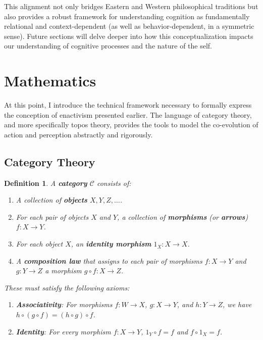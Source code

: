 \documentclass{article}
\newtheorem{definition}{Definition}[section]
\begin{document}
This alignment not only bridges Eastern and Western philosophical traditions but also provides a robust framework for understanding cognition as fundamentally relational and context-dependent (as well as behavior-dependent, in a symmetric sense). Future sections will delve deeper into how this conceptualization impacts our understanding of cognitive processes and the nature of the self.

\section{Mathematics}

At this point, I introduce the technical framework necessary to formally express the conception of enactivism presented earlier. The language of category theory, and more specifically topos theory, provides the tools to model the co-evolution of action and perception abstractly and rigorously.

\subsection{Category Theory}

\begin{definition}
A \textbf{category} $\mathcal{C}$ consists of:
\begin{enumerate}[label=(\alph*)]
    \item A collection of \textbf{objects} $X, Y, Z, \dots$.
    \item For each pair of objects $X$ and $Y$, a collection of \textbf{morphisms} (or \textbf{arrows}) $f \colon X \to Y$.
    \item For each object $X$, an \textbf{identity morphism} $1_X \colon X \to X$.
    \item A \textbf{composition law} that assigns to each pair of morphisms $f \colon X \to Y$ and $g \colon Y \to Z$ a morphism $g \circ f \colon X \to Z$.
\end{enumerate}
These must satisfy the following axioms:
\begin{enumerate}
    \item \textbf{Associativity}: For morphisms $f \colon W \to X$, $g \colon X \to Y$, and $h \colon Y \to Z$, we have $h \circ (g \circ f) = (h \circ g) \circ f$.
    \item \textbf{Identity}: For every morphism $f \colon X \to Y$, $1_Y \circ f = f$ and $f \circ 1_X = f$.
\end{enumerate}
\end{definition}
\end{document}

